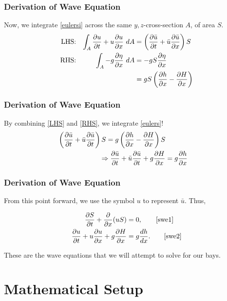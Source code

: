 	\begin{frame}
		\frametitle{Derivation of Wave Equation}
		Now, we integrate \eqref{eulersi} across the same $y,z$-cross-section $A$, of area $S$.\\
		\begin{align} 
			\text{LHS:}& & \int_A \frac{ \partial u}{\partial t} + u\frac{ \partial u}{\partial x} \ dA &= \left( \frac{ \partial \bar{u}}{\partial t} + \bar{u} \frac{ \partial \bar{u}}{\partial x} \right) S  \label{LHS}\\
			\text{RHS:}& & \int_A -g \frac{ \partial \eta}{\partial x} \ dA &= -gS \frac{ \partial \eta}{\partial x} \notag\\
			& & &= gS \left( \frac{ \partial h}{\partial x} - \frac{ \partial H}{\partial x} \label{RHS} \right)
		\end{align}
	\end{frame}

	\begin{frame}
		\frametitle{Derivation of Wave Equation}
		By combining \eqref{LHS} and \eqref{RHS}, we integrate \eqref{eulers}!
		\begin{align}
			\left( \frac{ \partial \bar{u}}{\partial t} + \bar{u} \frac{ \partial \bar{u}}{\partial t} \right) S = g \left( \frac{ \partial h}{\partial x} - \frac{ \partial H}{\partial x} \right) S \notag \\
			\label{swe2} \Rightarrow \frac{ \partial \bar{u}}{\partial t} + \bar{u} \frac{ \partial \bar{u}}{\partial t} + g\frac{ \partial H}{\partial x} &= g\frac{ \partial h}{\partial x} 
		\end{align}
	\end{frame}

	\begin{frame}
		\frametitle{Derivation of Wave Equation}
		From this point forward, we use the symbol $u$ to represent $\bar{u}$.  Thus,
		\begin{framed} \begin{align}
			\frac{\partial S}{\partial t} + \frac{\partial}{\partial x}(uS) &= 0, \tag*{\eqref{swe1}}\\
			\frac{\partial u}{\partial t} + u \frac{\partial u}{\partial x} + g \frac{\partial H}{\partial x} &= g \frac{dh}{dx}. \tag*{\eqref{swe2}}
		\end{align} \end{framed}
		These are the wave equations that we will attempt to solve for our bays.
	\end{frame}


\section{Mathematical Setup}

